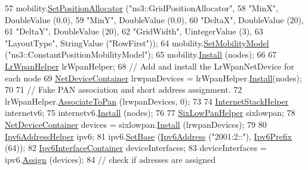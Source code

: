 \begin{DoxyCode}
57   mobility.\hyperlink{classns3_1_1MobilityHelper_ac59d5295076be3cc11021566713a28c5}{SetPositionAllocator} (\textcolor{stringliteral}{"ns3::GridPositionAllocator"},
58                                  \textcolor{stringliteral}{"MinX"}, DoubleValue (0.0),
59                                  \textcolor{stringliteral}{"MinY"}, DoubleValue (0.0),
60                                  \textcolor{stringliteral}{"DeltaX"}, DoubleValue (20),
61                                  \textcolor{stringliteral}{"DeltaY"}, DoubleValue (20),
62                                  \textcolor{stringliteral}{"GridWidth"}, UintegerValue (3),
63                                  \textcolor{stringliteral}{"LayoutType"}, StringValue (\textcolor{stringliteral}{"RowFirst"}));
64   mobility.\hyperlink{classns3_1_1MobilityHelper_a030275011b6f40682e70534d30280aba}{SetMobilityModel} (\textcolor{stringliteral}{"ns3::ConstantPositionMobilityModel"});
65   mobility.\hyperlink{classns3_1_1MobilityHelper_a07737960ee95c0777109cf2994dd97ae}{Install} (nodes);
66   
67   \hyperlink{classns3_1_1LrWpanHelper}{LrWpanHelper} lrWpanHelper;
68   \textcolor{comment}{// Add and install the LrWpanNetDevice for each node}
69   \hyperlink{classns3_1_1NetDeviceContainer}{NetDeviceContainer} lrwpanDevices = lrWpanHelper.\hyperlink{classns3_1_1LrWpanHelper_a7863b7b79168f747197faf479e4951fe}{Install}(nodes);
70 
71   \textcolor{comment}{// Fake PAN association and short address assignment.}
72   lrWpanHelper.\hyperlink{classns3_1_1LrWpanHelper_a3721e2624f82dfe56f03f1764afe3a07}{AssociateToPan} (lrwpanDevices, 0);
73 
74   \hyperlink{classns3_1_1InternetStackHelper}{InternetStackHelper} internetv6;
75   internetv6.\hyperlink{classns3_1_1InternetStackHelper_a6645b412f31283d2d9bc3d8a95cebbc0}{Install} (nodes);
76 
77   \hyperlink{classns3_1_1SixLowPanHelper}{SixLowPanHelper} sixlowpan;
78   \hyperlink{classns3_1_1NetDeviceContainer}{NetDeviceContainer} devices = sixlowpan.\hyperlink{classns3_1_1SixLowPanHelper_a638d855fa28d59736b59446aefccf7b3}{Install} (lrwpanDevices); 
79  
80   \hyperlink{classns3_1_1Ipv6AddressHelper}{Ipv6AddressHelper} ipv6;
81   ipv6.\hyperlink{classns3_1_1Ipv6AddressHelper_a13467412e9da6263395c09460681c0f1}{SetBase} (\hyperlink{classns3_1_1Ipv6Address}{Ipv6Address} (\textcolor{stringliteral}{"2001:2::"}), \hyperlink{classns3_1_1Ipv6Prefix}{Ipv6Prefix} (64));
82   \hyperlink{classns3_1_1Ipv6InterfaceContainer}{Ipv6InterfaceContainer} deviceInterfaces;
83   deviceInterfaces = ipv6.\hyperlink{classns3_1_1Ipv6AddressHelper_aad4685588aea1757beaf881bc4157912}{Assign} (devices);
84   \textcolor{comment}{// check if adresses are assigned}

\end{DoxyCode}
